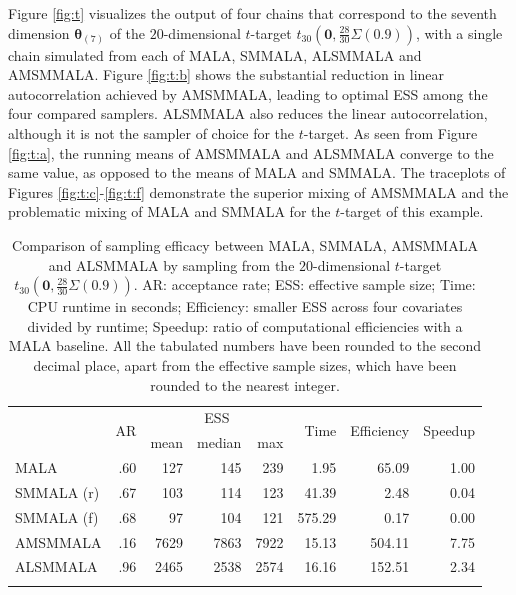 \documentclass[twoside,11pt]{article}
\begin{document}
Figure \ref{fig:t} visualizes the output of four chains that correspond to the seventh dimension $\boldsymbol{\theta}_{(7)}$
of the $20$-dimensional $t$-target $t_{30}(\mathbf{0},\frac{28}{30}\Sigma(0.9))$, with a single chain simulated from each of 
MALA, SMMALA, ALSMMALA and AMSMMALA. Figure \ref{fig:t:b} shows the substantial reduction in linear autocorrelation achieved 
by AMSMMALA, leading to optimal ESS among the four compared samplers. ALSMMALA also reduces the linear autocorrelation, 
although it is not the sampler of choice for the $t$-target. As seen from Figure \ref{fig:t:a}, the running means of AMSMMALA 
and ALSMMALA converge to the same value, as opposed to the means of MALA and SMMALA. The traceplots of Figures 
\ref{fig:t:c}-\ref{fig:t:f} demonstrate the superior mixing of AMSMMALA and the problematic mixing of MALA and SMMALA for 
the $t$-target of this example.

\begin{table}
	\begin{tabular}{l|r|rrr|r|r|r}
		\hline\noalign{\smallskip}
		\multirow{2}{*}{Method} &
		\multirow{2}{*}{AR} &
		\multicolumn{3}{c|}{ESS} &
		\multirow{2}{*}{Time} &
		\multirow{2}{*}{Efficiency} &
		\multirow{2}{*}{Speedup} \\
		& & mean & median & max & & & \\
		\noalign{\smallskip}\hline\noalign{\smallskip}
		MALA & .60 & 127 & 145 & 239 & 1.95 & 65.09 & 1.00 \\
		SMMALA (r) & .67 & 103 & 114 & 123 & 41.39 & 2.48 & 0.04 \\
		SMMALA (f) & .68 & 97 & 104 & 121 & 575.29 & 0.17 & 0.00 \\
		AMSMMALA & .16 & 7629 & 7863 & 7922 & 15.13 & 504.11 & 7.75 \\
		ALSMMALA & .96 & 2465 & 2538 & 2574 & 16.16 & 152.51 & 2.34 \\	
		\noalign{\smallskip}\hline
	\end{tabular}
	\caption{Comparison of sampling efficacy between MALA, SMMALA, AMSMMALA and ALSMMALA by sampling from the $20$-dimensional
		$t$-target $t_{30}(\mathbf{0},\frac{28}{30}\Sigma(0.9))$. AR: acceptance rate; ESS: effective sample size; Time: CPU 
		runtime in seconds; Efficiency: smaller ESS across four covariates divided by runtime; Speedup: ratio of computational 
		efficiencies with a MALA baseline. All the tabulated numbers have been rounded to the second decimal place, apart from 
		the effective sample sizes, which have been rounded to the nearest integer.}
	\label{tab:t}
\end{table}
\end{document}
